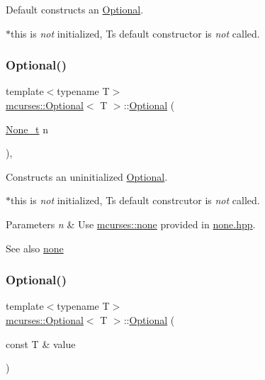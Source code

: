 Default constructs an \hyperlink{classmcurses_1_1Optional}{Optional}. 

$\ast$this is {\itshape not} initialized, T\textquotesingle{}s default constructor is {\itshape not} called. \hypertarget{classmcurses_1_1Optional_a59e637ea31df67b8a2453597603b1493}{}\label{classmcurses_1_1Optional_a59e637ea31df67b8a2453597603b1493} 
\subsubsection{\texorpdfstring{Optional()}{Optional()}\hspace{0.1cm}{\footnotesize\ttfamily [2/10]}}
{\footnotesize\ttfamily template$<$typename T$>$ \\
\hyperlink{classmcurses_1_1Optional}{mcurses\+::\+Optional}$<$ T $>$\+::\hyperlink{classmcurses_1_1Optional}{Optional} (\begin{DoxyParamCaption}\item[{\hyperlink{classmcurses_1_1None__t}{None\+\_\+t}}]{n }\end{DoxyParamCaption})\hspace{0.3cm}{\ttfamily [inline]}, {\ttfamily [noexcept]}}



Constructs an uninitialized \hyperlink{classmcurses_1_1Optional}{Optional}. 

$\ast$this is {\itshape not} initialized, T\textquotesingle{}s default constrcutor is {\itshape not} called. 
\begin{DoxyParams}{Parameters}
{\em n} & Use \hyperlink{namespacemcurses_a3fd18c73e6d453dcdfdd1fcdaf9bb0d7}{mcurses\+::none} provided in \hyperlink{none_8hpp}{none.\+hpp}. \\
\hline
\end{DoxyParams}
\begin{DoxySeeAlso}{See also}
\hyperlink{namespacemcurses_a3fd18c73e6d453dcdfdd1fcdaf9bb0d7}{none} 
\end{DoxySeeAlso}
\hypertarget{classmcurses_1_1Optional_a337b6aa5d069a287cb76867b912dfb47}{}\label{classmcurses_1_1Optional_a337b6aa5d069a287cb76867b912dfb47} 
\subsubsection{\texorpdfstring{Optional()}{Optional()}\hspace{0.1cm}{\footnotesize\ttfamily [3/10]}}
{\footnotesize\ttfamily template$<$typename T$>$ \\
\hyperlink{classmcurses_1_1Optional}{mcurses\+::\+Optional}$<$ T $>$\+::\hyperlink{classmcurses_1_1Optional}{Optional} (\begin{DoxyParamCaption}\item[{const T \&}]{value }\end{DoxyParamCaption})\hspace{0.3cm}{\ttfamily [inline]}}



